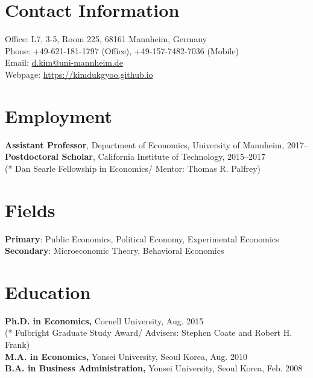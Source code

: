 \documentclass[margin, letterpaper]{res}
\begin{document}
 

\begin{resume} 
\section{Contact Information} Office: L7, 3-5, Room 225, 68161 Mannheim, Germany\\
Phone: +49-621-181-1797 (Office), +49-157-7482-7036 (Mobile)\\
Email: \href{mailto:d.kim@uni-mannheim.de}{d.kim@uni-mannheim.de}\\
Webpage: \url{https://kimdukgyoo.github.io}

\section{Employment}
\textbf{Assistant Professor}, Department of Economics, University of Mannheim, 2017--\\
\textbf{Postdoctoral Scholar}, California Institute of Technology, 2015--2017\\
(* Dan Searle Fellowship in Economics/ Mentor: Thomas R. Palfrey)

\section{Fields}
\textbf{Primary}: Public Economics, Political Economy, Experimental Economics\\
\textbf{Secondary}: Microeconomic Theory, Behavioral Economics

\section{Education} 
\textbf{Ph.D. in Economics,} Cornell University, Aug. 2015\\
(* Fulbright Graduate Study Award/ Advisers: Stephen Coate and Robert H. Frank)\\
\textbf{M.A. in Economics,} Yonsei University, Seoul Korea,  Aug. 2010\\
\textbf{B.A. in Business Administration,} Yonsei University, Seoul Korea, Feb. 2008


\end{resume}
\end{document}
